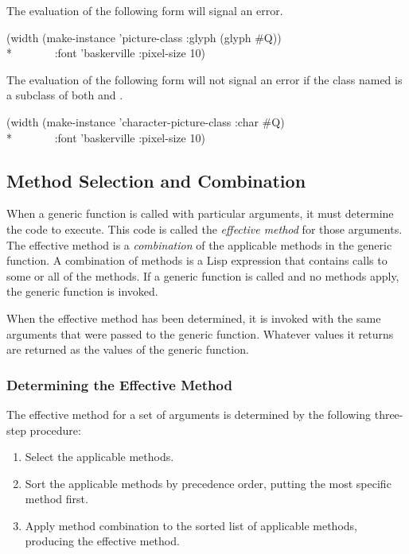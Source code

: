 The evaluation of the following form will signal an error.

\begin{lisp}
(width (make-instance 'picture-class :glyph (glyph \#{\Xbackslash}Q)) \\*
~~~~~~~:font 'baskerville :pixel-size 10)
\end{lisp}

The evaluation of the following form will not signal an error
if the class named  is a subclass of
both  and .

\begin{lisp}
(width (make-instance 'character-picture-class :char \#{\Xbackslash}Q) \\*
~~~~~~~:font 'baskerville :pixel-size 10)
\end{lisp}


\subsection{Method Selection and Combination}
\label{Method-Selection-and-Combination-SECTION}

When a generic function is called with particular arguments, it must
determine the code to execute.  This code is called the \emph{effective
  method} for those arguments.  The effective method is a \emph{combination}
of the applicable methods in the generic function.  A 
combination of methods is a Lisp expression that contains calls to some or
all of the methods.  If a generic function is
called and no methods apply, the generic function 
 is invoked.

When the effective method has been determined, it is invoked with the same
arguments that were passed to the generic function.  Whatever values it
returns are returned as the values of the generic function.

\subsubsection{Determining the Effective Method}
\label{Determining-the-Effective-Method-SECTION}

The effective method for a set of
arguments is determined by the following three-step procedure:

\begin{enumerate}

\item Select the applicable methods.

\item Sort the applicable methods by precedence order, putting
the most specific method first.

\item Apply method combination to the sorted list of
applicable methods, producing the effective method.

\end{enumerate}

